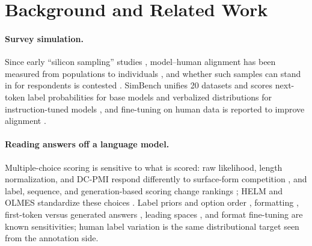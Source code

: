 \documentclass[11pt]{article}
\begin{document}
\section{Background and Related Work}

\paragraph{Survey simulation.}
Since early ``silicon sampling'' studies \cite{argyle2023out,aher2023using},
model--human alignment has been measured from populations to individuals
\cite{santurkar2023opinions,durmus2024globalopinionqa,suh2025subpop,
cao-etal-2025-specializing,wang-etal-2025-sociobench,park2024generative,
bisbee2024synthetic,tjuatja2024biases,
dominguez-olmedo-etal-2024-questioning,williams-etal-2026-beyond,
libovicky-2026-credibility}, and whether such samples can stand in for respondents is contested \cite{dillion2023replace,boelaert2025machine,anthis2025llm}. SimBench
\cite{hu-etal-2026-simbench} unifies 20 datasets and scores next-token label
probabilities for base models and verbalized distributions for
instruction-tuned models \citep[see also][]{meister-etal-2025-benchmarking,ahnert-etal-2026-survey,hu-levy-2023-prompting},
and fine-tuning on human data is reported to improve alignment
\cite{kolluri-etal-2025-finetuning,suh2025subpop,krsteski-etal-2026-valid,
huang-etal-2026-distribution}.

\paragraph{Reading answers off a language model.}
Multiple-choice scoring is sensitive to what is scored: raw likelihood,
length normalization, and DC-PMI respond differently to surface-form
competition \cite{holtzman-etal-2021-surface}, and label, sequence, and
generation-based scoring change rankings
\cite{robinson2023leveraging,shen-etal-2025-revisiting,tsvilodub2024predictions,lyu-etal-2024-beyond};
HELM and OLMES standardize these choices
\cite{liang2022helm,gu-etal-2025-olmes,biderman2024lessons}. Label priors and
option order \cite{zhao2021calibrate,zheng2024mcq,pezeshkpour-hruschka-2024-large},
formatting \cite{sclar2024quantifying,alzahrani-etal-2024-benchmarks,
mizrahi-etal-2024-state}, first-token versus generated answers
\cite{wang-etal-2024-answer-c,wang2024look}, leading spaces
\cite{sanz-guerrero-etal-2025-mind}, and format fine-tuning \cite{bunn-etal-2025-format} are known sensitivities; human label variation \cite{plank-2022-problem,uma2021learning,nie-etal-2020-learn} is the same distributional target seen from the annotation side.
\end{document}
